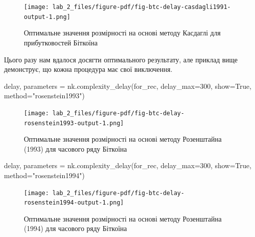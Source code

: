 \documentclass[
  letterpaper,
]{report}
\newenvironment{Shaded}{\begin{snugshade}}{\end{snugshade}}
\newcommand{\DecValTok}[1]{\textcolor[rgb]{0.68,0.00,0.00}{#1}}
\newcommand{\NormalTok}[1]{\textcolor[rgb]{0.00,0.23,0.31}{#1}}
\newcommand{\OperatorTok}[1]{\textcolor[rgb]{0.37,0.37,0.37}{#1}}
\newcommand{\StringTok}[1]{\textcolor[rgb]{0.13,0.47,0.30}{#1}}
\newcommand{\VariableTok}[1]{\textcolor[rgb]{0.07,0.07,0.07}{#1}}
\begin{document}
\begin{figure}[H]

{\centering \texttt{[image: lab\_2\_files/figure-pdf/fig-btc-delay-casdagli1991-output-1.png]}

}

\caption{\label{fig-btc-delay-casdagli1991}Оптимальне значення
розмірності на основі методу Касдаглі для прибутковостей Біткоїна}

\end{figure}

Цього разу нам вдалося досягти оптимального результату, але приклад вище
демонструє, що кожна процедура має свої виключення.

\begin{Shaded}
\begin{Highlighting}[]
\NormalTok{delay, parameters }\OperatorTok{=}\NormalTok{ nk.complexity\_delay(for\_rec, }
\NormalTok{                                        delay\_max}\OperatorTok{=}\DecValTok{300}\NormalTok{, show}\OperatorTok{=}\VariableTok{True}\NormalTok{,}
\NormalTok{                                        method}\OperatorTok{=}\StringTok{"rosenstein1993"}\NormalTok{)}
\end{Highlighting}
\end{Shaded}

\begin{figure}[H]

{\centering \texttt{[image: lab\_2\_files/figure-pdf/fig-btc-delay-rosenstein1993-output-1.png]}

}

\caption{\label{fig-btc-delay-rosenstein1993}Оптимальне значення
розмірності на основі методу Розенштайна (1993) для часового ряду
Біткоїна}

\end{figure}

\begin{Shaded}
\begin{Highlighting}[]
\NormalTok{delay, parameters }\OperatorTok{=}\NormalTok{ nk.complexity\_delay(for\_rec, }
\NormalTok{                                        delay\_max}\OperatorTok{=}\DecValTok{300}\NormalTok{, show}\OperatorTok{=}\VariableTok{True}\NormalTok{,}
\NormalTok{                                        method}\OperatorTok{=}\StringTok{"rosenstein1994"}\NormalTok{)}
\end{Highlighting}
\end{Shaded}

\begin{figure}[H]

{\centering \texttt{[image: lab\_2\_files/figure-pdf/fig-btc-delay-rosenstein1994-output-1.png]}

}

\caption{\label{fig-btc-delay-rosenstein1994}Оптимальне значення
розмірності на основі методу Розенштайна (1994) для часового ряду
Біткоїна}

\end{figure}
\end{document}
